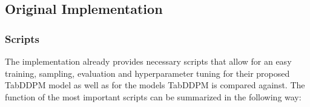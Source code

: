 \subsection{Original Implementation}
\label{ch:conceptualDesign-existingCodeBase-originalImplementation}

\subsubsection[]{Scripts}

The implementation \cite{kotelnikov2022TabDDPMModellingTabular} already provides necessary scripts that allow for an
easy training, sampling, evaluation and hyperparameter tuning for their proposed TabDDPM model as well as for the models TabDDPM is compared against.
The function of the most important scripts can be summarized in the following way:

